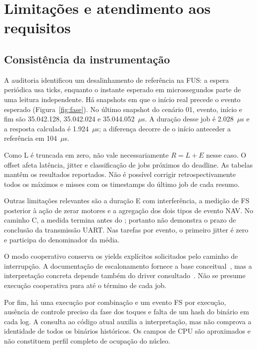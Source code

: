 \section{Limitações e atendimento aos requisitos}
\label{sec:limitacoes}

\subsection{Consistência da instrumentação}

A auditoria identificou um desalinhamento de referência na FUS: a espera periódica usa ticks, enquanto o instante esperado em microssegundos parte de uma leitura independente. Há snapshots em que o início real precede o evento esperado (Figura~\ref{fig:fase}). No último snapshot do cenário 01, evento, início e fim são 35.042.128, 35.042.024 e 35.044.052~$\mu$s. A duração desse job é 2.028~$\mu$s e a resposta calculada é 1.924~$\mu$s; a diferença decorre de o início anteceder a referência em 104~$\mu$s.

Como L é truncada em zero, não vale necessariamente $R=L+E$ nesse caso. O offset afeta latência, jitter e classificação de jobs próximos do deadline. As tabelas mantêm os resultados reportados. Não é possível corrigir retrospectivamente todos os máximos e misses com os timestamps do último job de cada resumo.


Outras limitações relevantes são a duração E com interferência, a medição de FS posterior à ação de zerar motores e a agregação dos dois tipos de evento NAV. No caminho C, a medida termina antes do ; portanto não demonstra o prazo de conclusão da transmissão UART. Nas tarefas por evento, o primeiro jitter é zero e participa do denominador da média.

O modo cooperativo conserva os yields explícitos solicitados pelo caminho de interrupção. A documentação de escalonamento fornece a base conceitual~\cite{barry_freertos}, mas a interpretação concreta depende também do driver consultado~\cite{idf_touch_driver}. Não se presume execução cooperativa pura até o término de cada job.

Por fim, há uma execução por combinação e um evento FS por execução, ausência de controle preciso da fase dos toques e falta de um hash do binário em cada log. A consulta ao código atual auxilia a interpretação, mas não comprova a identidade de todos os binários históricos. Os campos de CPU são aproximados e não constituem perfil completo de ocupação do núcleo.

